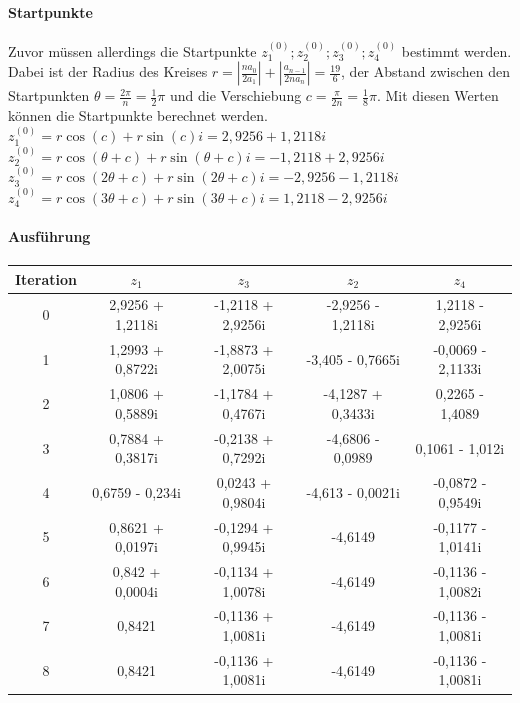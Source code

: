 \documentclass[12pt]{article}
\begin{document}
\paragraph{Startpunkte}
Zuvor müssen allerdings die Startpunkte $z_1^{(0)};z_2^{(0)};z_3^{(0)};z_4^{(0)}$ bestimmt werden. Dabei ist der Radius des Kreises $r = |\frac{na_0}{2a_1}| + |\frac{a_{n-1}}{2na_n}| = \frac{19}{6}$, der Abstand zwischen den Startpunkten $\theta = \frac{2\pi}{n} = \frac{1}{2}\pi$ und die Verschiebung $c = \frac{\pi}{2n} = \frac{1}{8}\pi$. Mit diesen Werten können die Startpunkte berechnet werden. \\
$z_1^{(0)} = r \cos(c) + r \sin(c)i = 2,9256 + 1,2118i$ \\
$z_2^{(0)} = r \cos(\theta+c) + r \sin(\theta+c)i = -1,2118 + 2,9256i$ \\
$z_3^{(0)} = r \cos(2\theta+c) + r \sin(2\theta+c)i = -2,9256 - 1,2118i$ \\
$z_4^{(0)} = r \cos(3\theta+c) + r \sin(3\theta+c)i = 1,2118 - 2,9256i$

\paragraph{Ausführung}
\begin{center}
\begin{tabular}{c|c c c c}
    Iteration & $z_1$ & $z_3$ & $z_2$ & $z_4$ \\
    \hline
    0 & 2,9256 + 1,2118i & -1,2118 + 2,9256i & -2,9256 - 1,2118i & 1,2118 - 2,9256i \\
    1 & 1,2993 + 0,8722i & -1,8873 + 2,0075i & -3,405 - 0,7665i & -0,0069 - 2,1133i \\
    2 & 1,0806 + 0,5889i & -1,1784 + 0,4767i & -4,1287 + 0,3433i & 0,2265 - 1,4089 \\
    3 & 0,7884 + 0,3817i & -0,2138 + 0,7292i & -4,6806 - 0,0989 & 0,1061 - 1,012i \\
    4 & 0,6759 - 0,234i & 0,0243 + 0,9804i & -4,613 - 0,0021i & -0,0872 - 0,9549i \\
    5 & 0,8621 + 0,0197i & -0,1294 + 0,9945i & -4,6149 & -0,1177 - 1,0141i \\
    6 & 0,842 + 0,0004i & -0,1134 + 1,0078i & -4,6149 & -0,1136 - 1,0082i \\
    7 & 0,8421 & -0,1136 + 1,0081i & -4,6149 & -0,1136 - 1,0081i \\
    8 & 0,8421 & -0,1136 + 1,0081i & -4,6149 & -0,1136 - 1,0081i \\
\end{tabular}
\end{center}
\end{document}
